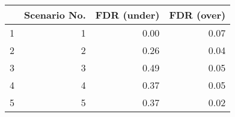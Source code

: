 \begin{tabular}{rrrr}
  \hline
 & Scenario No. & FDR (under) & FDR (over) \\ 
  \hline
1 &   1 & 0.00 & 0.07 \\ 
  2 &   2 & 0.26 & 0.04 \\ 
  3 &   3 & 0.49 & 0.05 \\ 
  4 &   4 & 0.37 & 0.05 \\ 
  5 &   5 & 0.37 & 0.02 \\ 
   \hline
\end{tabular}
